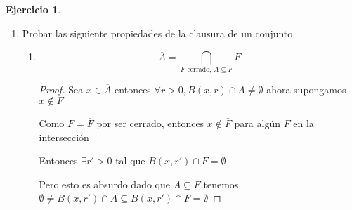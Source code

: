 \documentclass[12pt]{article}
\newcommand{\ol}{\overline}
\newcommand{\open}{\mathrm{o}}
\theoremstyle{definition}
\newtheorem{ej}{Ejercicio}
\begin{document}
\begin{ej}
\begin{enumerate}
\begin{enumerate}
\begin{proof}
	  Pero entonces $B(x,r) \subseteq A$ por lo que $x \in A^{\open}$

	  Tambien $B(x,r) \subseteq B$ por lo que $x \in B^{\open}$

	  Luego $x \in A^{\open} \cap B^{\open}$

	$\supseteq )$ Sea $x \in A^{\open} \cap B^{\open}$ entonces $x \in A^{\open}$ y $x \in B^{\open}$ 

	Entonces existe $B(x,r_{1}) \subseteq A$ y también $B(x,r_{2}) \subseteq B$

	Si tomamos $r = \min{ \{r_{1},r_{2}\}}$ tenemos que $B(x,r) \subseteq A$ y tambien $B(x,r) \subseteq B$

      Entonces $B(x,r) \subseteq A \cap B$ finalmente $ x \in (A \cap B)^{\open}$
	  \end{proof}
	\item $(A \cup B)^{\open} \supseteq A^{\open} \cup B^{\open}$ ¿Vale la igualdad?
	  \begin{proof}
	    $x \in A^{\open} \cup B^{\open}$ entonces $x$ esta en alguno de los dos o los dos interiores

	    Supongamos $x \in A^{\open}$ entonces existe $B(x,r) \subseteq A \subseteq A \cup B$

	    Entonces $x \in (A \cup B)^{\open}$

	    Si esta en ambos , en particular esta en una , asi que usamos lo de arriba nuevamente

	    No vale la igualdad por ejemplo $A = [1,2]$ y $ B =  [2,3]$

	    $A^{\open} \cup B^{\open} = (1,2) \cup (2,3) \neq (1,3) = ([1,3])^{\open} = (A \cup B)^{\open}$
	  \end{proof}
      \end{enumerate}
    \item Probar las siguiente propiedades de la clausura de un conjunto
      \begin{enumerate}
	\item $$\ol A = \bigcap_{F \text{ cerrado, } A \subseteq F} F$$
	  \begin{proof}
	    Sea $x \in \ol A$ entonces $\forall r>0 , B(x,r) \cap A \neq \emptyset$ ahora supongamos $x \notin F$

	    Como $F = \ol F$ por ser cerrado, entonces $x \notin \ol F$ para algún $F$ en la intersección

	    Entonces $\exists r'>0$ tal que $B(x,r') \cap F = \emptyset$

	    Pero esto es absurdo dado que $A \subseteq F$ tenemos $\emptyset \neq B(x,r') \cap A \subseteq B(x,r') \cap F = \emptyset$


\end{proof}
\end{enumerate}
\end{enumerate}
\end{ej}
\end{document}

